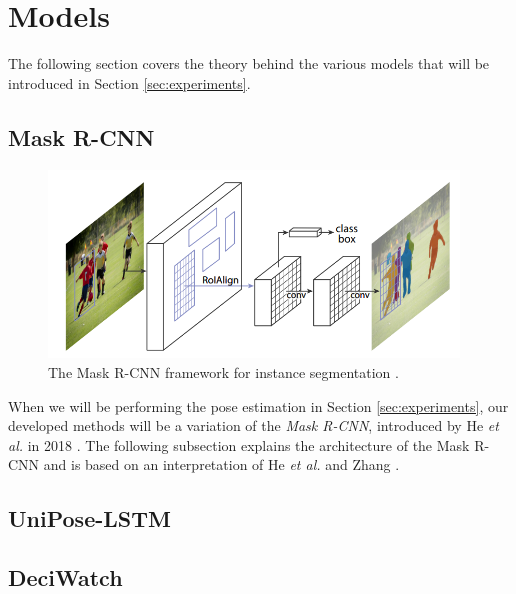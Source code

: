 \documentclass[./main.tex]{subfiles}
\begin{document}
\section{Models}
The following section covers the theory behind the various models that will be introduced in Section \ref{sec:experiments}.

\subsection{Mask R-CNN}
\begin{figure}[htbp]
    \centering
    \includegraphics[height=5cm]{./entities/mask_rcnn.PNG}
    \caption{The Mask R-CNN framework for instance segmentation \cite{https://doi.org/10.48550/arxiv.1703.06870}.}
    \label{fig:mask_rcnn}
\end{figure}
\noindent When we will be performing the pose estimation in Section \ref{sec:experiments}, our developed methods will be a variation of the \textit{Mask R-CNN}, introduced by He \textit{et al.} in 2018 \cite{https://doi.org/10.48550/arxiv.1703.06870}. The following subsection explains the architecture of the Mask R-CNN and is based on an interpretation of He \textit{et al.} \cite{https://doi.org/10.48550/arxiv.1703.06870} and Zhang \cite{mask_rcnn_explained}.

\subsection{UniPose-LSTM}

\subsection{DeciWatch}
\end{document}
